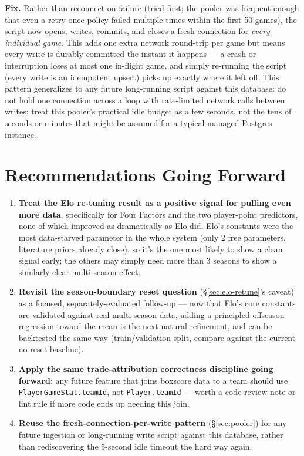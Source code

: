 \documentclass[11pt]{article}
\newcommand{\code}[1]{\allowbreak\texttt{\small #1}\allowbreak}
\begin{document}
\textbf{Fix.} Rather than reconnect-on-failure (tried first; the pooler was frequent enough that even a
retry-once policy failed multiple times within the first 50 games), the script now opens, writes, commits,
and closes a fresh connection for \emph{every individual game}. This adds one extra network round-trip per
game but means every write is durably committed the instant it happens — a crash or interruption loses at
most one in-flight game, and simply re-running the script (every write is an idempotent upsert) picks up
exactly where it left off. This pattern generalizes to any future long-running script against this database:
do not hold one connection across a loop with rate-limited network calls between writes; treat this pooler's
practical idle budget as a few seconds, not the tens of seconds or minutes that might be assumed for a
typical managed Postgres instance.

\section{Recommendations Going Forward}

\begin{enumerate}
    \item \textbf{Treat the Elo re-tuning result as a positive signal for pulling even more data}, specifically
    for Four Factors and the two player-point predictors, none of which improved as dramatically as Elo did.
    Elo's constants were the most data-starved parameter in the whole system (only 2 free parameters,
    literature priors already close), so it's the one most likely to show a clean signal early; the others
    may simply need more than 3 seasons to show a similarly clear multi-season effect.
    \item \textbf{Revisit the season-boundary reset question} (\S\ref{sec:elo-retune}'s caveat) as a focused,
    separately-evaluated follow-up — now that Elo's core constants are validated against real multi-season
    data, adding a principled offseason regression-toward-the-mean is the next natural refinement, and can be
    backtested the same way (train/validation split, compare against the current no-reset baseline).
    \item \textbf{Apply the same trade-attribution correctness discipline going forward}: any future feature
    that joins boxscore data to a team should use \code{PlayerGameStat.teamId}, not \code{Player.teamId} —
    worth a code-review note or lint rule if more code ends up needing this join.
    \item \textbf{Reuse the fresh-connection-per-write pattern} (\S\ref{sec:pooler}) for any future ingestion
    or long-running write script against this database, rather than rediscovering the 5-second idle timeout
    the hard way again.
\end{enumerate}
\end{document}
